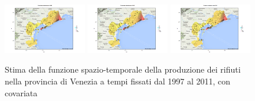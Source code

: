 \documentclass[a4paper,11pt,twoside,openright]{book}							%
\begin{document}
\begin{figure}[H]
\includegraphics[trim=0cm 0cm 4cm 0cm,clip=true,width=0.32\textwidth]{Immagini/venezia_con_covariate/Maps2009.png}
\includegraphics[trim=0cm 0cm 4cm 0cm,clip=true,width=0.32\textwidth]{Immagini/venezia_con_covariate/Maps2010.png}
\includegraphics[trim=0cm 0cm 4cm 0cm,clip=true,width=0.32\textwidth]{Immagini/venezia_con_covariate/Maps2011.png}
\caption{Stima della funzione spazio-temporale della produzione dei rifiuti nella provincia di Venezia a tempi fissati dal 1997 al 2011, con covariata}
\label{fig:Vencovar_ris}
\end{figure}
\end{document}
